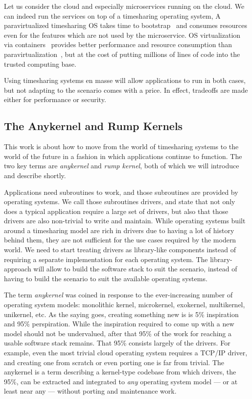 Let us consider the cloud and especially microservices running on the cloud.
We can indeed run the services on top of a timesharing operating system,
A paravirtualized timesharing OS takes time to bootstrap~\cite{jiang:soda}
and consumes resources even for the features which are not used by
the microservice.  OS virtualization via containers~\cite{phk:jails}
provides better performance and resource consumption than
paravirtualization~\cite{soltesz:containers,wang:overhead}, but at the
cost of putting millions of lines of code into the trusted computing base.

Using timesharing systems en masse will allow applications to run in both
cases, but not adapting to the scenario comes with a price.  In effect,
tradeoffs are made either for performance or security.


\subsection{The Anykernel and Rump Kernels}

This work is about how to move from the world of timesharing systems
to the world of the future in a fashion in which applications continue
to function.  The two key terms are \textit{anykernel} and
\textit{rump kernel}, both of which we will introduce and describe shortly.

Applications need subroutines to work, and those subroutines are provided
by operating systems.  We call those subroutines drivers, and state that
not only does a typical application require a large set of drivers,
but also that those drivers are also non-trivial to write and maintain.  While
operating systems built around a timesharing model are rich in drivers
due to having a lot of history behind them, they are not sufficient for
the use cases required by the modern world.  We need to
start treating drivers as library-like components instead of requiring a
separate implementation for each operating system.  The library-approach
will allow to build the software stack to suit the scenario, instead of
having to build the scenario to suit the available operating systems.

The term \textit{anykernel} was coined in response to the ever-increasing
number of operating system models: monolithic kernel, microkernel,
exokernel, multikernel, unikernel, etc.  As the saying goes,
creating something new is is 5\% inspiration and 95\% perspiration.
While the inspiration required to come up with a new model should not be
undervalued, after that 95\% of the work for reaching a usable software
stack remains.  That 95\% consists largely of the drivers.  For example,
even the most trivial cloud operating system requires a TCP/IP driver,
and creating one from scratch or even porting one is far from trivial.
The anykernel is a term describing a kernel-type codebase from which
drivers, the 95\%, can be extracted and integrated to \textit{any}
operating system model --- or at least near any --- without porting and
maintenance work.

